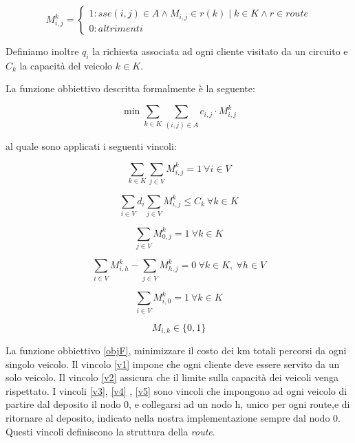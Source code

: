 \documentclass[]{article}
\begin{document}
\[M_{i,j}^k = \left\{
\begin{array}{lr}
1 :sse (i,j) \in A \wedge M_{i,j} \in  r(k) \mid k \in K \wedge r \in route\\
0 :altrimenti
\end{array}
\right.
\]

Definiamo inoltre \emph{$q_{i}$} la richiesta associata ad ogni cliente visitato da un circuito e \emph{$C_{k}$} la capacità del veicolo \emph{$k \in K$}.

La funzione obbiettivo descritta formalmente è la seguente:

\begin{equation} \label{objF}
\min \sum_{k \in K} \sum_{(i,j) \in A} c_{i,j} \cdot M_{i,j}^k 
\end{equation}



al quale sono applicati i seguenti vincoli:

\begin{equation} \label{v1}
 \sum_{k \in K} \sum_{j \in V} M_{i,j}^k = 1 \ \forall i \in V
\end{equation}

\begin{equation} \label{v2}
\sum_{i \in V} d_{i} \sum_{j \in V} M_{i,j}^k \leq C_{k} \ \forall k \in K
\end{equation}

\begin{equation} \label{v3}
\sum_{j \in V} M_{0,j}^k = 1 \ \forall k \in K
\end{equation}

\begin{equation} \label{v4}
\sum_{i \in V} M_{i,h}^k - \sum_{j \in V} M_{h,j}^k = 0 \ \forall k \in K ,\  \forall h \in V
\end{equation}

\begin{equation} \label{v5}
\sum_{i \in V} M_{i,0}^k = 1 \ \forall k \in K
\end{equation}

\begin{equation} \label{GAP4}
M_{i,k} \in \{0,1\}
\end{equation}




La funzione obbiettivo \ref{objF}, minimizzare il costo dei km totali percorsi da ogni singolo veicolo.
Il vincolo \ref{v1} impone che ogni cliente deve essere servito da un solo veicolo.
Il vincolo \ref{v2} assicura che il limite sulla capacità dei veicoli venga rispettato.
I vincoli \ref{v3}, \ref{v4} , \ref{v5} sono vincoli che impongono ad ogni veicolo di partire dal deposito il nodo 0, e collegarsi ad un nodo h, unico per ogni route,e di ritornare al deposito, indicato nella nostra implementazione sempre dal nodo 0. Questi vincoli definiscono la struttura della \emph{route}.
\end{document}
